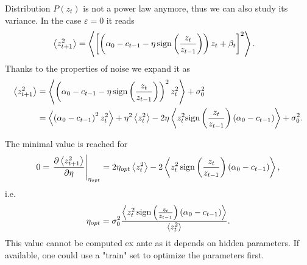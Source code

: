 \documentclass[FinalReport.tex]{subfiles}
\begin{document}
Distribution $P(z_t)$ is not a power law anymore, thus we can also study its variance. In the case $\varepsilon=0$ it reads
\begin{align}
	\expval{z_{t+1}^2}&=\expval{\left[\left(\alpha_0-c_{t-1}-\eta\,\text{sign}\left(\frac{z_t}{z_{t-1}}\right)\right)z_t +\beta_t\right]^2}.
\end{align}
Thanks to the properties of noise we expand it as
\begin{align}
	\expval{z_{t+1}^2}&=\expval{\left(\alpha_0-c_{t-1}-\eta\,\text{sign}\left(\frac{z_t}{z_{t-1}}\right)\right)^2z_t^2}+\sigma_0^2\\
	&=\expval{\left(\alpha_0-c_{t-1}\right)^2z_t^2}+\eta^2\expval{z_t^2}-2\eta\expval{z_t^2\text{sign}\left(\frac{z_t}{z_{t-1}}\right)(\alpha_0-c_{t-1})}+\sigma_0^2.
\end{align}

The minimal value is reached for 
\begin{equation}
	0=\left.\pdv{\expval{z_{t+1}^2}}{\eta}\right\vert_{\eta_{opt}}=2\eta_{opt}\expval{z_t^2}-2\expval{z_t^2\,\text{sign}\left(\frac{z_t}{z_{t-1}}\right)(\alpha_0-c_{t-1})},
\end{equation}
i.e.
\begin{equation}
	\eta_{opt}=	\sigma_0^2\frac{\expval{z_t^2\,\text{sign}\left(\frac{z_t}{z_{t-1}}\right)(\alpha_0-c_{t-1})}}{\expval{z_t^2}}.
\end{equation}
This value cannot be computed ex ante as it depends on hidden parameters. If available, one could use a "train" set to optimize the parameters first.
\end{document}
